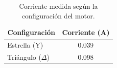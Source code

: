 \begin{table}[H]
    \centering
    \caption{Corriente medida según la configuración del motor.}

    \begin{tabular}{lc}
        \toprule
        \textbf{Configuración} & \textbf{Corriente (A)} \\
        \midrule
        Estrella (Y)  & 0.039 \\
        Triángulo ($\Delta$) & 0.098 \\
        \bottomrule
    \end{tabular}
\end{table}

